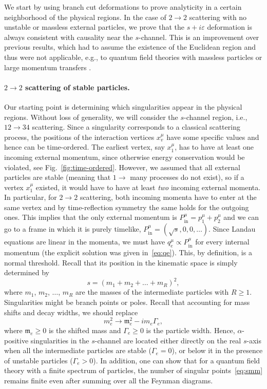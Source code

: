 \documentclass[12pt]{article}
\numberwithin{figure}{section}
\def \be {\begin{equation}}
\def \ee {\end{equation}}
\def \eps {\varepsilon}
\def \geq {\geqslant}
\def \inn {\mathrm{in}}
\def \m {\mathfrak{m}}
\begin{document}
	We start by using branch cut deformations to prove analyticity in a certain neighborhood of the physical regions. In the case of $2\to2$ scattering with no unstable or massless external particles, we prove that the $s + i\eps$ deformation is always consistent with causality near the $s$-channel. This is an improvement over previous results, which had to assume the existence of the Euclidean region and thus were not applicable, e.g., to quantum field theories with massless particles or large momentum transfers \cite{Eden:1966dnq}.
	
	\paragraph{$2 \to 2$ scattering of stable particles.}
	Our starting point is determining which singularities appear in the physical regions. Without loss of generality, we will consider the $s$-channel region, i.e., $12\to34$ scattering.
	Since a singularity corresponds to a classical scattering process, the positions of the interaction vertices $x_v^\mu$ have some specific values and hence can be time-ordered. The earliest vertex, say $x_1^\mu$, has to have at least one incoming external momentum, since otherwise energy conservation would be violated, see Fig.~\ref{fig:time-ordered}. However, we assumed that all external particles are stable (meaning that $1 \to$ many processes do not exist), so if a vertex $x_1^\mu$ existed, it would have to have at least \emph{two} incoming external momenta. In particular, for $2\to 2$ scattering, both incoming momenta have to enter at the same vertex and by time-reflection symmetry the same holds for the outgoing ones. This implies that the only external momentum is $P_{\inn}^\mu = p_1^\mu + p_2^\mu$ and we can go to a frame in which it is purely timelike, $P_{\inn}^\mu = (\sqrt{s},0,0,\ldots)$. Since Landau equations are linear in the momenta, we must have $q_e^\mu \propto P_\inn^\mu$ for every internal momentum (the explicit solution was given in~\eqref{eq:qe}). This, by definition, is a normal threshold. Recall that its position in the kinematic space is simply determined by
	\be\label{eq:smm}
	s = (m_1 + m_2 + \ldots + m_R)^2,
	\ee
	where $m_1$, $m_2$, $\ldots$, $m_R$ are the masses of the intermediate particles with $R\geq 1$. Singularities might be branch points or poles. Recall that accounting for mass shifts and decay widths, we should replace
	\be
	m_e^2 \to \m_e^2 - i m_e \Gamma_e,
	\ee
	where $\mathfrak{m}_e \geq 0$ is the shifted mass and $\Gamma_e \geq 0$ is the particle width. Hence, $\alpha$-positive singularities in the $s$-channel are located either directly on the real $s$-axis when all the intermediate particles are stable ($\Gamma_e = 0$), or below it in the presence of unstable particles ($\Gamma_e > 0$). In addition, one can show \cite{doi:10.1063/1.1705398} that for a quantum field theory with a finite spectrum of particles, the number of singular points~\eqref{eq:smm} remains finite even after summing over all the Feynman diagrams.
	
\end{document}
